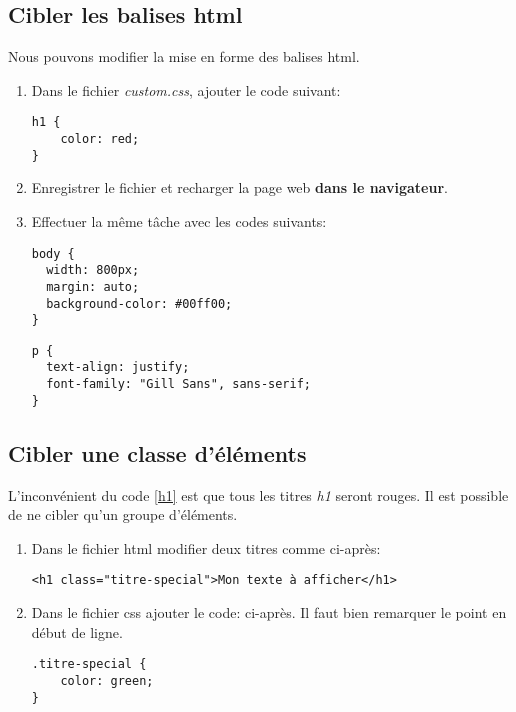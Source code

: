 \documentclass[a4paper,11pt]{article}
\begin{document}
\begin{Form}
\subsection{Cibler les balises html}
Nous pouvons modifier la mise en forme des balises html.
\begin{activite}
\begin{enumerate}
\item Dans le fichier \emph{custom.css}, ajouter le code suivant:
\begin{center}
\begin{lstlisting}
h1 {
	color: red;
}
\end{lstlisting}
\label{h1}
\end{center}
\item Enregistrer le fichier et recharger la page web \textbf{dans le navigateur}.
\item Effectuer la même tâche avec les codes suivants:
\begin{lstlisting}
body {
  width: 800px;
  margin: auto;
  background-color: #00ff00;
}
\end{lstlisting}
\begin{lstlisting}
p {
  text-align: justify;
  font-family: "Gill Sans", sans-serif;
}
\end{lstlisting}
\end{enumerate}
\end{activite}
\subsection{Cibler une classe d'éléments}
L'inconvénient du code \ref{h1} est que tous les titres \emph{h1} seront rouges. Il est possible de ne cibler qu'un groupe d'éléments.
\begin{activite}
\begin{enumerate}
\item Dans le fichier html modifier deux titres comme ci-après:
\begin{lstlisting}
<h1 class="titre-special">Mon texte à afficher</h1>
\end{lstlisting}
\medskip
\item Dans le fichier css ajouter le code: ci-après. Il faut bien remarquer le point en début de ligne.
\begin{lstlisting}
.titre-special {
	color: green;
}
\end{lstlisting}
\medskip
\end{enumerate}
\end{activite}

\end{Form}
\end{document}
